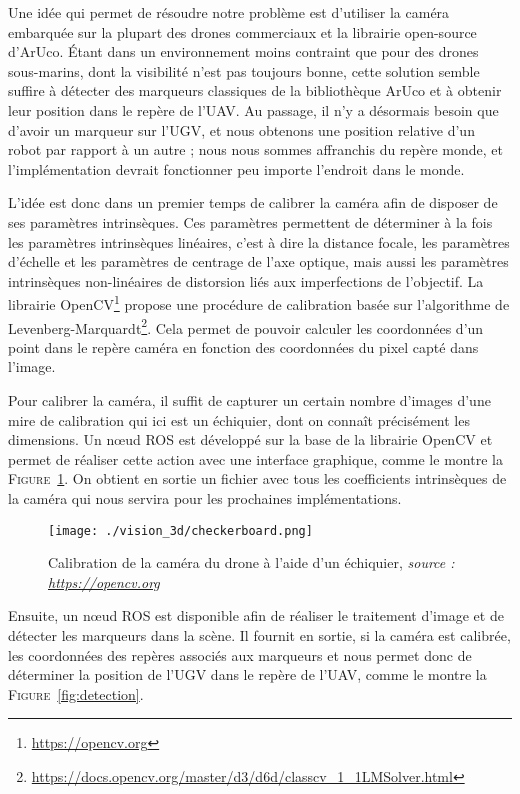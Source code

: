     Une idée qui permet de résoudre notre problème est d’utiliser la caméra embarquée sur la plupart des drones commerciaux et la librairie open-source d’ArUco. Étant dans un environnement moins contraint que pour des drones sous-marins, dont la visibilité n’est pas toujours bonne, cette solution semble suffire à détecter des marqueurs classiques de la bibliothèque ArUco et à obtenir leur position dans le repère de l’UAV. Au passage, il n’y a désormais besoin que d’avoir un marqueur sur l’UGV, et nous obtenons une position relative d’un robot par rapport à un autre ; nous nous sommes affranchis du repère monde, et l’implémentation devrait fonctionner peu importe l’endroit dans le monde.

    L’idée est donc dans un premier temps de calibrer la caméra afin de disposer de ses paramètres intrinsèques. Ces paramètres permettent de déterminer à la fois les paramètres intrinsèques linéaires, c’est à dire la distance focale, les paramètres d'échelle et les paramètres de centrage de l’axe optique, mais aussi les paramètres intrinsèques non-linéaires de distorsion liés aux imperfections de l’objectif. La librairie OpenCV\footnote{\url{https://opencv.org}} propose une procédure de calibration basée sur l’algorithme de Levenberg-Marquardt\footnote{\url{https://docs.opencv.org/master/d3/d6d/classcv_1_1LMSolver.html}}. Cela permet de pouvoir calculer les coordonnées d’un point dans le repère caméra en fonction des coordonnées du pixel capté dans l’image.

    Pour calibrer la caméra, il suffit de capturer un certain nombre d'images d’une mire de calibration qui ici est un échiquier, dont on connaît précisément les dimensions. Un nœud ROS est développé sur la base de la librairie OpenCV et permet de réaliser cette action avec une interface graphique, comme le montre la \textsc{Figure}~\ref{fig:checkerboard}. On obtient en sortie un fichier avec tous les coefficients intrinsèques de la caméra qui nous servira pour les prochaines implémentations.

    \begin{figure}[!htb]
        \centering
        \texttt{[image: ./vision\_3d/checkerboard.png]}
        \caption{Calibration de la caméra du drone à l'aide d'un échiquier, \textit{source : \url{https://opencv.org}}}
        \label{fig:checkerboard}
    \end{figure}

    Ensuite, un nœud ROS est disponible afin de réaliser le traitement d’image et de détecter les marqueurs dans la scène. Il fournit en sortie, si la caméra est calibrée, les coordonnées des repères associés aux marqueurs et nous permet donc de déterminer la position de l’UGV dans le repère de l’UAV, comme le montre la \textsc{Figure}~\ref{fig:detection}.

